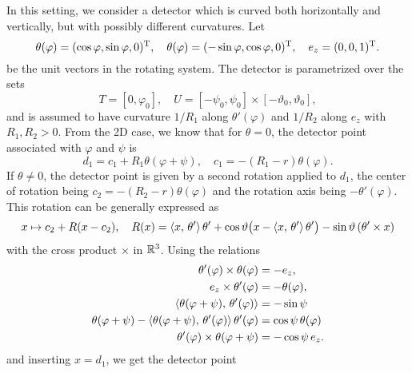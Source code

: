 \documentclass{amsart}
\renewcommand*{\phi}{\varphi}
\begin{document}
In this setting, we consider a detector which is curved both horizontally and vertically, but with possibly different curvatures. Let
%
\begin{equation}
 \label{eq:conecurved_unitvecs}
 \theta(\phi) = \TRANSP{(\cos\phi, \sin\phi, 0)}, \quad \theta(\phi) = \TRANSP{(-\sin\phi, \cos\phi, 0)}, \quad e_z = \TRANSP{(0, 0, 1)}.
\end{equation}
%
be the unit vectors in the rotating system. The detector is parametrized over the sets
%
\begin{equation}
 \label{eq:conecurved_params}
 T = [0, \phi_0],\quad U = [-\psi_0, \psi_0] \times [-\vartheta_0, \vartheta_0],
\end{equation}
%
and is assumed to have curvature $1/R_1$ along $\theta'(\phi)$ and $1/R_2$ along $e_z$ with $R_1,R_2 >0$. From the 2D case, we know that 
for $\theta=0$, the detector point associated with $\phi$ and $\psi$ is
%
\begin{equation*}
 d_1 = c_1 + R_1 \theta(\phi + \psi), \quad c_1 = -(R_1 - r) \theta(\phi).
\end{equation*}
%
If $\theta \neq 0$, the detector point is given by a second rotation applied to $d_1$, the center of rotation being $c_2 = -(R_2 - r) 
\theta(\phi)$ and the rotation axis being $-\theta'(\phi)$. This rotation can be generally expressed as
%
\begin{equation*}
 x \mapsto c_2 + R(x - c_2), \quad R(x) = \langle x,\,\theta'\rangle\, \theta' + \cos\vartheta \big(x - \langle x,\,\theta'\rangle\, \theta'\big) 
 - \sin\vartheta\, (\theta' \times x)
\end{equation*}
%
with the cross product $\times$ in ${\mathbb{R}}^3$. Using the relations
%
\begin{align*}
 \theta'(\phi) \times \theta(\phi) &= -e_z, \\
 e_z \times \theta'(\phi) &= -\theta(\phi), \\
 \INNER{\theta(\phi + \psi)}{\theta'(\phi)} &= -\sin\psi \\
 \theta(\phi + \psi) - \INNER{\theta(\phi + \psi)}{\theta'(\phi)}\, \theta'(\phi) &= \cos\psi\, \theta(\phi)\\
 \theta'(\phi) \times \theta(\phi + \psi) &= -\cos\psi\, e_z.
\end{align*}
%
and inserting $x = d_1$, we get the detector point
%
\end{document}
